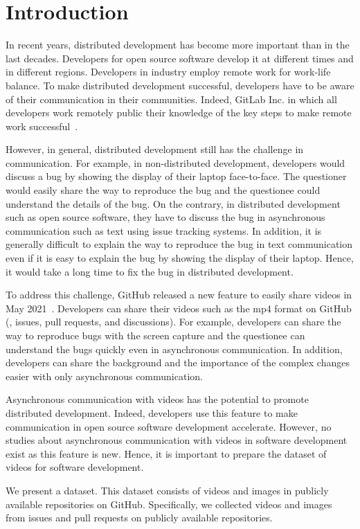 \section{Introduction}
\label{sec:intro}
In recent years, distributed development has become 
more important than in the last decades. 
Developers for open source software develop it 
at different times and in different regions. 
Developers in industry employ remote work for work-life balance. 
To make distributed development successful, 
developers have to be aware of their communication 
in their communities. 
Indeed, GitLab Inc. in which all developers work remotely 
public their knowledge of the key steps 
to make remote work successful~\citep{gitlab2020remoteplaybook}. 


However, in general, distributed development still has 
the challenge in communication. 
For example, in non-distributed development, 
developers would discuss a bug by showing the display of 
their laptop face-to-face. 
The questioner would easily share the way to reproduce the bug 
and the questionee could understand the details of the bug. 
On the contrary, in distributed development such as 
open source software, they have to discuss the bug 
in asynchronous communication 
such as text using issue tracking systems. 
In addition, it is generally difficult to explain the way 
to reproduce the bug in text communication 
even if it is easy to explain the bug by showing 
the display of their laptop. 
Hence, it would take a long time to fix the bug 
in distributed development. 


To address this challenge, GitHub released a new feature 
to easily share videos in May 2021~\citep{github-video-blog}. 
Developers can share their videos such as the mp4 format 
on GitHub (\eg,  issues, pull requests, and discussions). 
For example, developers can share the way to reproduce bugs 
with the screen capture and the questionee can understand 
the bugs quickly even in asynchronous communication. 
In addition, developers can share the background and 
the importance of the complex changes easier with 
only asynchronous communication. 


Asynchronous communication with videos has the potential 
to promote distributed development. 
Indeed, developers use this feature to make communication 
in open source software development accelerate. 
However, no studies about asynchronous communication with 
videos in software development exist 
as this feature is new. 
Hence, it is important to prepare the dataset of videos 
for software development. 


We present a dataset. 
This dataset consists of videos and images 
in publicly available repositories on GitHub. 
Specifically, we collected 
 videos and 
 images from 
 issues and 
 pull requests on 
 publicly available repositories.
